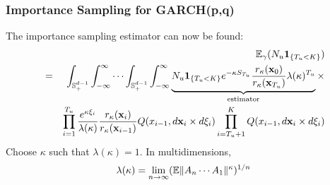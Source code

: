 \documentclass{beamer}
\begin{document}
\begin{frame}
  \frametitle{Importance Sampling for GARCH(p,q)}
  The importance sampling estimator can now be found:
  \begin{eqnarray*}
    && \mathbb{E}_\gamma (N_u \mathbf{1}_{\{T_u < K\}}) \\
    &=&
    \int_{\mathbb S_+^{d-1}} \int_{-\infty}^\infty
    \cdots
    \int_{\mathbb S_+^{d-1}} \int_{-\infty}^\infty
    \underbrace{
      N_u \mathbf{1}_{\{T_u < K\}} e^{-\kappa S_{T_u}}
      {r_\kappa(\mathbf{x}_{0}) \over r_\kappa(\mathbf{x}_{T_u})}
      \lambda(\kappa)^{T_u}
    }_{\text{estimator}}
    \times \\ 
    && \prod_{i=1}^{T_u}
    {e^{\kappa \xi_i} \over \lambda(\kappa)}
    {r_\kappa(\mathbf{x}_i) \over r_\kappa(\mathbf{x}_{i-1})}
    Q(x_{i-1}, d\mathbf{x}_{i} \times d\xi_{i})
    \prod_{i=T_u+1}^{K}
    Q(x_{i-1}, d\mathbf{x}_{i} \times d\xi_{i})
  \end{eqnarray*}
  Choose $\kappa$ such that $\lambda(\kappa) = 1$. In multidimensions,
  \[
  \lambda(\kappa) = \lim_{n \to \infty} (\mathbb{E} \|A_n \cdots A_1\|^\kappa)^{1/n}
  \]
\end{frame}
\end{document}
